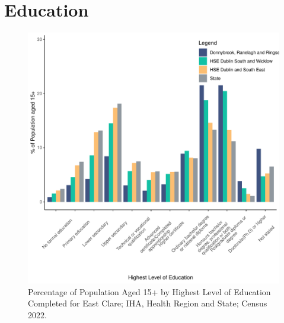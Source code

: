\documentclass{article}
\begin{document}
\section{Education}\label{sect:Edu}
\begin{figure}[H]
	\centering
	\includegraphics[width = 120mm]{../figures/EduED.pdf}
	\caption{Percentage of Population Aged 15+ by Highest Level of Education Completed for East Clare; IHA, Health Region and State; Census 2022.}
	\label{fig:vbnv}
	\end{figure}
\end{document}
